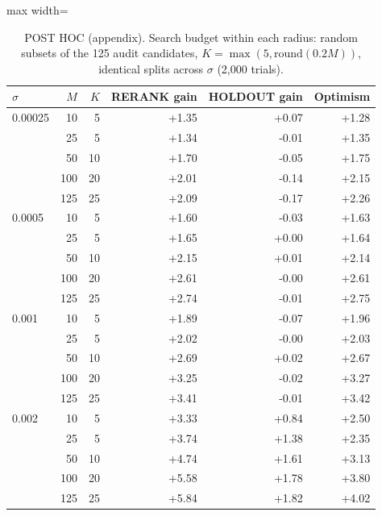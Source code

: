 \begin{table}[t]
\centering
\small
\begin{adjustbox}{max width=\linewidth}
\begin{tabular}{lrrrrr}
\toprule
$\sigma$ & $M$ & $K$ & RERANK gain & HOLDOUT gain & Optimism \\
\midrule
0.00025 & 10 & 5 & +1.35 & +0.07 & +1.28 \\
 & 25 & 5 & +1.34 & -0.01 & +1.35 \\
 & 50 & 10 & +1.70 & -0.05 & +1.75 \\
 & 100 & 20 & +2.01 & -0.14 & +2.15 \\
 & 125 & 25 & +2.09 & -0.17 & +2.26 \\
\midrule
0.0005 & 10 & 5 & +1.60 & -0.03 & +1.63 \\
 & 25 & 5 & +1.65 & +0.00 & +1.64 \\
 & 50 & 10 & +2.15 & +0.01 & +2.14 \\
 & 100 & 20 & +2.61 & -0.00 & +2.61 \\
 & 125 & 25 & +2.74 & -0.01 & +2.75 \\
\midrule
0.001 & 10 & 5 & +1.89 & -0.07 & +1.96 \\
 & 25 & 5 & +2.02 & -0.00 & +2.03 \\
 & 50 & 10 & +2.69 & +0.02 & +2.67 \\
 & 100 & 20 & +3.25 & -0.02 & +3.27 \\
 & 125 & 25 & +3.41 & -0.01 & +3.42 \\
\midrule
0.002 & 10 & 5 & +3.33 & +0.84 & +2.50 \\
 & 25 & 5 & +3.74 & +1.38 & +2.35 \\
 & 50 & 10 & +4.74 & +1.61 & +3.13 \\
 & 100 & 20 & +5.58 & +1.78 & +3.80 \\
 & 125 & 25 & +5.84 & +1.82 & +4.02 \\
\bottomrule
\end{tabular}
\end{adjustbox}
\caption{POST HOC (appendix). Search budget within each radius: random subsets of the 125 audit candidates, $K=\max(5,\mathrm{round}(0.2M))$, identical splits across $\sigma$ (2,000 trials).}
\label{tab:radius-budget}
\end{table}
